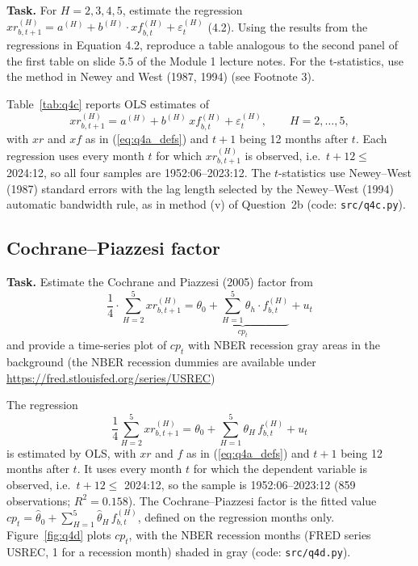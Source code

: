 \documentclass[11pt]{article}
\makeatletter
\newcommand{\xr}{\mathit{xr}}
\newcommand{\xf}{\mathit{xf}}
\newcommand{\task}[1]{\par\if@nobreak\else\needspace{5\baselineskip}\fi\medskip\noindent
  \begin{minipage}{\linewidth}\textbf{Task.} #1\end{minipage}\par   %
  \nopagebreak\medskip\@afterheading}   %
\makeatother
\begin{document}
\task{For $H = 2, 3, 4, 5$, estimate the regression
$\xr^{(H)}_{b,t+1} = a^{(H)} + b^{(H)} \cdot \xf^{(H)}_{b,t} + \varepsilon^{(H)}_t$ (4.2).
Using the results from the regressions in Equation 4.2, reproduce a table analogous to the
second panel of the first table on slide 5.5 of the Module 1 lecture notes. For the
t-statistics, use the method in Newey and West (1987, 1994) (see Footnote 3).}

Table~\ref{tab:q4c} reports OLS estimates of
\begin{equation}
  \xr^{(H)}_{b,t+1} = a^{(H)} + b^{(H)}\,\xf^{(H)}_{b,t} + \varepsilon^{(H)}_t,
  \qquad H = 2, \dots, 5,
  \label{eq:q4c_regression}
\end{equation}
with $\xr$ and $\xf$ as in (\ref{eq:q4a_defs}) and $t+1$ being 12 months after $t$. Each
regression uses every month $t$ for which $\xr^{(H)}_{b,t+1}$ is observed, i.e.\ $t + 12 \le$
2024:12, so all four samples are 1952:06--2023:12. The $t$-statistics use Newey--West (1987)
standard errors with the lag length selected by the Newey--West (1994) automatic bandwidth
rule, as in method (v) of Question~2b (code: \texttt{src/q4c.py}).

\begin{table}[H]
  \centering
  
  \caption{OLS estimates of $b^{(H)}$ in regression (\ref{eq:q4c_regression}), with
  Newey--West (1987, 1994) $t$-statistics in brackets (selected lags 23, 23, 24 and 23 for
  $H = 2, 3, 4, 5$) and $R^2$ in percent. Monthly observations, predictor months
  1952:06--2023:12 (859 observations for each $H$).}
  \label{tab:q4c}
\end{table}

\subsection{Cochrane--Piazzesi factor}

\task{Estimate the Cochrane and Piazzesi (2005) factor from
\[
  \frac{1}{4} \cdot \sum_{H=2}^{5} \xr^{(H)}_{b,t+1}
  = \underbrace{\theta_0 + \sum_{H=1}^{5} \theta_h \cdot f^{(H)}_{b,t}}_{cp_t} + u_t
  \tag*{(4.3)}
\]
and provide a time-series plot of $cp_t$ with NBER recession gray areas in the background (the
NBER recession dummies are available under \url{https://fred.stlouisfed.org/series/USREC})}

The regression
\begin{equation}
  \frac{1}{4} \sum_{H=2}^{5} \xr^{(H)}_{b,t+1}
  = \theta_0 + \sum_{H=1}^{5} \theta_H\, f^{(H)}_{b,t} + u_t
  \label{eq:q4d_regression}
\end{equation}
is estimated by OLS, with $\xr$ and $f$ as in (\ref{eq:q4a_defs}) and $t+1$ being 12 months
after $t$. It uses every month $t$ for which the dependent variable is observed, i.e.\
$t + 12 \le$ 2024:12, so the sample is 1952:06--2023:12 (859 observations; $R^2 = 0.158$). The
Cochrane--Piazzesi factor is the fitted value
$cp_t = \hat\theta_0 + \sum_{H=1}^{5} \hat\theta_H\, f^{(H)}_{b,t}$, defined on the regression
months only. Figure~\ref{fig:q4d} plots $cp_t$, with the NBER recession months (FRED series
USREC, 1 for a recession month) shaded in gray (code: \texttt{src/q4d.py}).
\end{document}
